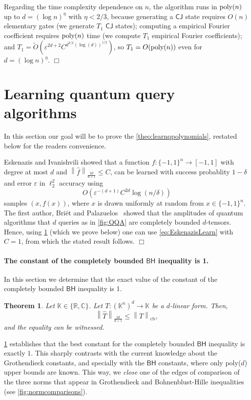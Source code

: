 \documentclass[11pt]{article}
\newcommand{\norm}[1]{\left\|{#1}\right\|}
\newcommand{\eps}{\varepsilon}
\newcommand{\BH}{\textsf{BH}}
\newcommand{\CJ}{\textsf{CJ}}
\theoremstyle{plain}
\newtheorem{theorem}{Theorem}
\DeclareMathOperator{\cb}{cb}
\renewcommand{\cb}{{\mathrm{cb}}}
\newcommand{\poly}{\mbox{\rm poly}}
\theoremstyle{plain}
\theoremstyle{definition}
\theoremstyle{remark}
\renewenvironment{proof}[1][]{
    \begin{trivlist}
    \item[\hspace{\labelsep}{\em\noindent Proof#1:\/}]}
    {{\hfill$\Box$}
    \end{trivlist}
}
\theoremstyle{named}
\begin{document}
\begin{proof}[ of \cref{prop:learnBlockEncoding}]
    
    Regarding the time complexity dependence on $n$, the algorithm runs in $\poly(n)$ up to $d=(\log n)^{\eta}$ with $\eta<2/3$, because generating a $\CJ$ state requires $O(n)$ elementary gates (we generate $T_1$ $\CJ$ states); computing a empirical Fourier coefficient requires $\poly(n)$ time (we compute $T_1$ empirical Fourier coefficients); and $T_1=\widetilde O(\eps^{2d+2}C^{ d^{3/2}(\log(d))^{1/2} })$, so $T_1=O(\poly (n))$ even for $d=(\log n)^{\eta}.$
\end{proof}








\section{Learning quantum query algorithms}
In this section our goal will be to prove the \cref{theo:learnqpolynomials}, restated below for the readers convenience.
\learnqpolynomials*
\begin{proof}
    Eskenazis and Ivanishvili showed that a function $f:\{-1,1\}^n\to [-1,1]$ with degree at most $d$ and $\norm{\widehat f}_{\frac{2d}{d+1}}\leq C$, can be learned with success probablity $1-\delta$ and error $\eps$ in $\ell_2^2$ accuracy using 
    \begin{equation}\label{eq:EskenazisLearn}
        O(\eps^{-(d+1)}C^{2d}\log(n/\delta)) 
    \end{equation}
    samples $(x,f(x))$, where $x$ is drawn uniformly at random from $x\in\{-1,1\}^n$.     The first author, Bri\"et and Palazuelos~\cite{QQA=CBF} showed that the amplitudes of quantum algorithms that $d$ queries as in \cref{fig:QQA} are completely bounded $d$-tensors. Hence, using \cref{theo:BHGf} (which we prove below) one can use \cref{eq:EskenazisLearn} with $C=1$, from which the stated result follows.
\end{proof}

\paragraph{The constant of the completely bounded $\BH$ inequality is 1.} In this section we determine that the exact value of the constant of the completely bounded $\BH$ inequality is 1.
\begin{theorem}\label{theo:BHGf}
    Let $\mathbb K\in\{\mathbb R,\mathbb C\}$. Let $T:(\mathbb K^n)^{d}\to\mathbb K$ be a $d$-linear form. Then, 
    $$\norm{\widehat T}_{\frac{2d}{d+1}}\leq \norm{T}_{\cb},$$ and the equality can be witnessed. 
\end{theorem}
\cref{theo:BHGf} establishes that the best constant for the completely bounded $\BH$ inequality is exactly $1$. This sharply contrasts with the current knowledge about the Grothendieck constants, and specially with the $\BH$ constants, where only poly($d$) upper bounds are known. This way, we \emph{close} one of the edges of comparison of the three norms that appear in Grothendieck and Bohnenblust-Hille inequalities (see  \cref{fig:normcomparisons}).
\end{document}
